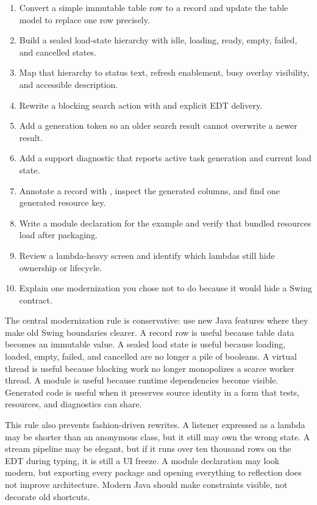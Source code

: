\begin{exercisebox}
\begin{enumerate}
\item Convert a simple immutable table row to a record and update the table model to replace one row precisely.
\item Build a sealed load-state hierarchy with idle, loading, ready, empty, failed, and cancelled states.
\item Map that hierarchy to status text, refresh enablement, busy overlay visibility, and accessible description.
\item Rewrite a blocking search action with  and explicit EDT delivery.
\item Add a generation token so an older search result cannot overwrite a newer result.
\item Add a support diagnostic that reports active task generation and current load state.
\item Annotate a record with , inspect the generated columns, and find one generated resource key.
\item Write a module declaration for the example and verify that bundled resources load after packaging.
\item Review a lambda-heavy screen and identify which lambdas still hide ownership or lifecycle.
\item Explain one modernization you chose not to do because it would hide a Swing contract.
\end{enumerate}
\end{exercisebox}

The central modernization rule is conservative: use new Java features where they make old Swing boundaries clearer. A record row is useful because table data becomes an immutable value. A sealed load state is useful because loading, loaded, empty, failed, and cancelled are no longer a pile of booleans. A virtual thread is useful because blocking work no longer monopolizes a scarce worker thread. A module is useful because runtime dependencies become visible. Generated code is useful when it preserves source identity in a form that tests, resources, and diagnostics can share.

This rule also prevents fashion-driven rewrites. A listener expressed as a lambda may be shorter than an anonymous class, but it still may own the wrong state. A stream pipeline may be elegant, but if it runs over ten thousand rows on the EDT during typing, it is still a UI freeze. A module declaration may look modern, but exporting every package and opening everything to reflection does not improve architecture. Modern Java should make constraints visible, not decorate old shortcuts.

